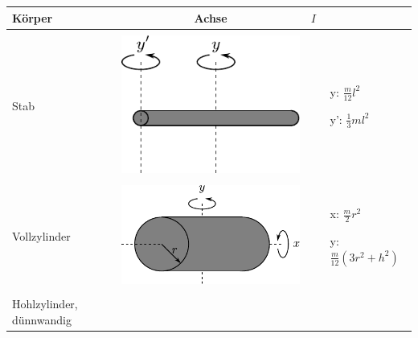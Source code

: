 \newpage
\begin{table}[h!]
\centering
\begin{tabular}{m{2cm} c m{}}
Körper	& Achse	& $I$ \\
\hline
& & \\
Stab &
	\begin{minipage}{0.3\textwidth}
	\centering
	\includegraphics[scale=\traegscale]{../fig/traeg-stab.pdf}
	\end{minipage} &
		\begin{itemize}
		\item[y:] $\frac{m}{12} l^2$
		\item[y':] $\frac{1}{3} m l^2$
		\end{itemize} \\
& & \\
Vollzylinder &
	\begin{minipage}{0.3\textwidth}
	\centering
	\includegraphics[scale=\traegscale]{../fig/traeg-vollzylinder.pdf}
	\end{minipage} &
		\begin{itemize}
		\item[x:] $\frac{m}{2} r^2$
		\item[y:] $\frac{m}{12} \left( 3r^2 + h^2 \right)$
		\end{itemize} \\
& & \\
Hohlzylinder, dünnwandig &
	\begin{minipage}{0.3\textwidth}

\end{minipage}
\end{tabular}
\end{table}
